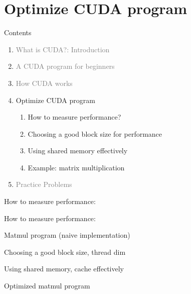 \documentclass[dvipdfmx,11pt]{beamer}   %
\begin{document}
\section{Optimize CUDA program}
\begin{frame}{Contents}
    \begin{enumerate}[<+->]   %
    \item \textcolor{gray}{What is CUDA?: Introduction}
    \item \textcolor{gray}{A CUDA program for beginners}
    \item \textcolor{gray}{How CUDA works}
    \item Optimize CUDA program
    \begin{enumerate}
      \item How to measure performance?
      \item Choosing a good block size for performance
      \item Using shared memory effectively
      \item Example: matrix multiplication
    \end{enumerate}
    \item \textcolor{gray}{Practice Problems}
  \end{enumerate}
\end{frame}
\begin{frame}{How to measure performance: }

\end{frame}
\begin{frame}{How to measure performance: }

\end{frame}
\begin{frame}{Matmul program (naive implementation)}

\end{frame}
\begin{frame}{Choosing a good block size, thread dim}

\end{frame}
\begin{frame}{Using shared memory, cache effectively}

\end{frame}
\begin{frame}{Optimized matmul program}

\end{frame}
\end{document}
